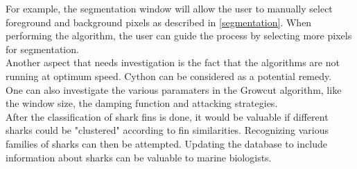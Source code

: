 \documentclass[a4paper,10pt]{article}
\begin{document}
For example, the segmentation window will allow the user to manually select foreground and background pixels as described in \ref{segmentation}.
When performing the algorithm, the user can guide the process by selecting more pixels for segmentation. \\

Another aspect that needs investigation is the fact that the algorithms are not
running at optimum speed.  Cython can be considered
as a potential remedy. \\

One can also investigate the various paramaters in the Growcut algorithm, like the window size, the damping function and attacking strategies. \\

After the classification of shark fins is done, it would be valuable if different sharks could be "clustered" according to fin similarities.
Recognizing various families of sharks can then be attempted.  Updating the database to include information about sharks can be valuable to marine biologists.  \\

\newpage

\end{document}
